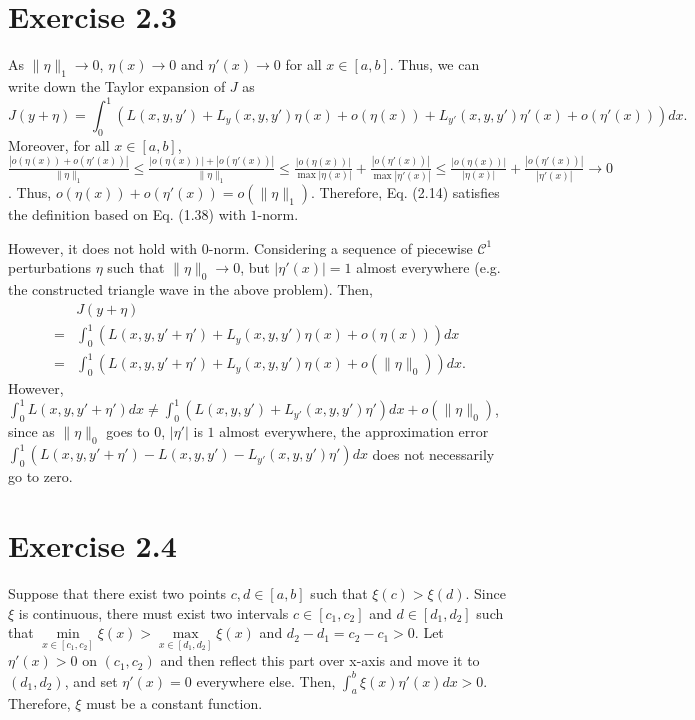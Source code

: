 \documentclass[11pt]{report}
\begin{document}
\section*{Exercise 2.3}
As $\|\eta\|_1 \to 0$, $\eta(x) \to 0$ and $\eta'(x) \to 0$ for all $x \in [a, b]$. Thus, we can write down the Taylor expansion of $J$ as
\[J(y+\eta) = \int_{0}^{1} \left(L(x,y,y') + L_y(x,y,y')\eta(x) + o(\eta(x)) + L_{y'}(x,y,y')\eta'(x) + o(\eta'(x))\right) dx.\]
Moreover, for all $x \in [a, b]$, $\frac{|o(\eta(x)) + o(\eta'(x))|}{\|\eta\|_1} \leq \frac{|o(\eta(x))| + |o(\eta'(x))|}{\|\eta\|_1} \leq \frac{|o(\eta(x))|}{\max |\eta(x)|} + \frac{|o(\eta'(x))|}{\max |\eta'(x)|} \leq \frac{|o(\eta(x))|}{|\eta(x)|} + \frac{|o(\eta'(x))|}{|\eta'(x)|} \to 0$. Thus, $o(\eta(x)) + o(\eta'(x)) = o(\|\eta\|_1)$. Therefore, Eq. (2.14) satisfies the definition based on Eq. (1.38) with $1$-norm.

\noindent However, it does not hold with $0$-norm. Considering a sequence of piecewise $\mathcal{C}^1$ perturbations $\eta$ such that $\|\eta\|_0 \to 0$, but $|\eta'(x)| = 1$ almost everywhere (e.g. the constructed triangle wave in the above problem). Then,
\begin{align*}
&J(y+\eta) \\= &\int_{0}^{1} \left(L(x,y,y'+\eta') + L_y(x,y,y')\eta(x) + o(\eta(x))\right) dx \\= &\int_{0}^{1} \left(L(x,y,y'+\eta') + L_y(x,y,y')\eta(x) + o(\|\eta\|_0)\right) dx.
\end{align*}
However, $\int_0^1 L(x,y,y'+\eta') dx \neq \int_0^1 \left(L(x,y,y') + L_{y'}(x,y,y')\eta'\right) dx + o(\|\eta\|_0)$, since as $\|\eta\|_0$ goes to $0$, $|\eta'|$ is $1$ almost everywhere, the approximation error $\int_0^1 \left(L(x,y,y'+\eta') - L(x,y,y') - L_{y'}(x,y,y')\eta'\right) dx$ does not necessarily go to zero.

\section*{Exercise 2.4}
Suppose that there exist two points $c,d \in [a, b]$ such that $\xi(c) > \xi(d)$. Since $\xi$ is continuous, there must exist two intervals $c \in [c_1, c_2]$ and $d \in [d_1, d_2]$ such that $\min\limits_{x \in [c_1, c_2]} \xi(x) > \max\limits_{x \in [d_1, d_2]} \xi(x)$ and $d_2 - d_1 = c_2 - c_1 > 0$. Let $\eta'(x) > 0$ on $(c_1, c_2)$ and then reflect this part over x-axis and move it to $(d_1, d_2)$, and set $\eta'(x) = 0$ everywhere else. Then, $\int_a^b \xi(x)\eta'(x) dx > 0$. Therefore, $\xi$ must be a constant function.
\end{document}
